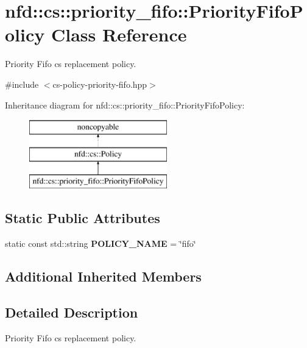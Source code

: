 \hypertarget{classnfd_1_1cs_1_1priority__fifo_1_1PriorityFifoPolicy}{}\section{nfd\+:\+:cs\+:\+:priority\+\_\+fifo\+:\+:Priority\+Fifo\+Policy Class Reference}
\label{classnfd_1_1cs_1_1priority__fifo_1_1PriorityFifoPolicy}


Priority Fifo cs replacement policy.  




{\ttfamily \#include $<$cs-\/policy-\/priority-\/fifo.\+hpp$>$}

Inheritance diagram for nfd\+:\+:cs\+:\+:priority\+\_\+fifo\+:\+:Priority\+Fifo\+Policy\+:\begin{figure}[H]
\begin{center}
\leavevmode
\includegraphics[height=3.000000cm]{classnfd_1_1cs_1_1priority__fifo_1_1PriorityFifoPolicy}
\end{center}
\end{figure}
\subsection*{Static Public Attributes}
\begin{DoxyCompactItemize}
\item 
static const std\+::string {\bfseries P\+O\+L\+I\+C\+Y\+\_\+\+N\+A\+ME} = \char`\"{}fifo\char`\"{}\hypertarget{classnfd_1_1cs_1_1priority__fifo_1_1PriorityFifoPolicy_a280437c1e9cc7db1a328bde81ec0fb0e}{}\label{classnfd_1_1cs_1_1priority__fifo_1_1PriorityFifoPolicy_a280437c1e9cc7db1a328bde81ec0fb0e}

\end{DoxyCompactItemize}
\subsection*{Additional Inherited Members}


\subsection{Detailed Description}
Priority Fifo cs replacement policy. 

